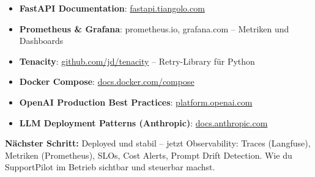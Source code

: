\begin{itemize}[leftmargin=*]
    \item \textbf{FastAPI Documentation}: \href{https://fastapi.tiangolo.com}{fastapi.tiangolo.com}
    \item \textbf{Prometheus \& Grafana}: prometheus.io, grafana.com -- Metriken und Dashboards
    \item \textbf{Tenacity}: \href{https://github.com/jd/tenacity}{github.com/jd/tenacity} -- Retry-Library für Python
    \item \textbf{Docker Compose}: \href{https://docs.docker.com/compose/}{docs.docker.com/compose}
    \item \textbf{OpenAI Production Best Practices}: \href{https://platform.openai.com/docs/guides/production-best-practices}{platform.openai.com}
    \item \textbf{LLM Deployment Patterns (Anthropic)}: \href{https://docs.anthropic.com/en/docs/quickstart}{docs.anthropic.com}
\end{itemize}

\textbf{Nächster Schritt:} Deployed und stabil -- jetzt Observability: Traces (Langfuse), Metriken (Prometheus), SLOs, Cost Alerts, Prompt Drift Detection. Wie du SupportPilot im Betrieb sichtbar und steuerbar machst.
\endinput

\clearpage
